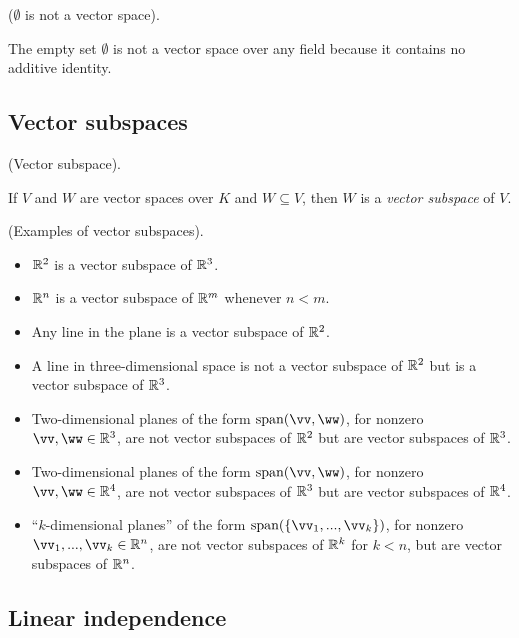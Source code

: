 \begin{remark}
    ($\emptyset$ is not a vector space).
    
    The empty set $\emptyset$ is not a vector space over any field because it contains no additive identity.
\end{remark}

\subsection*{Vector subspaces}

\begin{defn}
\label{ch::lin_alg::defn::vector_subspace}
    (Vector subspace). 
    
    If $V$ and $W$ are vector spaces over $K$ and $W \subseteq V$, then $W$ is a \textit{vector subspace} of $V$.
\end{defn}

\begin{remark}
    (Examples of vector subspaces).
    
    \begin{itemize}
        \item $\mathbb{R}^2$ is a vector subspace of $\mathbb{R}^3$.
        \item $\mathbb{R}^n$ is a vector subspace of $\mathbb{R}^m$ whenever $n < m$.
        \item Any line in the plane is a vector subspace of $\mathbb{R}^2$.
        \item A line in three-dimensional space is not a vector subspace of $\mathbb{R}^2$ but is a vector subspace of $\mathbb{R}^3$.
        \item Two-dimensional planes of the form $\spann(\vv, \ww)$, for nonzero $\vv, \ww \in \R^3$, are not vector subspaces of $\mathbb{R}^2$ but are vector subspaces of $\mathbb{R}^3$.
        \item Two-dimensional planes of the form $\spann(\vv, \ww)$, for nonzero $\vv, \ww \in \R^4$, are not vector subspaces of $\mathbb{R}^3$ but are vector subspaces of $\mathbb{R}^4$.
        \item ``$k$-dimensional planes'' of the form $\spann(\{\vv_1, ..., \vv_k\})$, for nonzero $\vv_1, ..., \vv_k \in \R^n$, are not vector subspaces of $\mathbb{R}^k$ for $k < n$, but are vector subspaces of $\mathbb{R}^n$.
    \end{itemize}
\end{remark}

\newpage

\subsection*{Linear independence}


